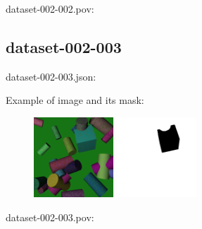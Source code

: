 dataset-002-002.pov:
\begin{scriptsize}
\begin{ttfamily}

\end{ttfamily}
\end{scriptsize}

\subsection{dataset-002-003}

dataset-002-003.json:
\begin{scriptsize}
\begin{ttfamily}

\end{ttfamily}
\end{scriptsize}

Example of image and its mask:
\begin{center}
\begin{figure}[H]
\centering\includegraphics[width=3cm]{./img-002-003.png}
\centering\includegraphics[width=3cm]{./mask-002-003.png}
\end{figure}
\end{center}

dataset-002-003.pov:
\begin{scriptsize}
\begin{ttfamily}

\end{ttfamily}
\end{scriptsize}

